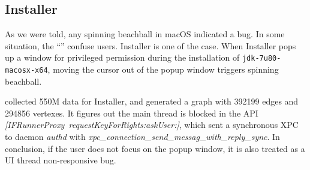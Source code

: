 \subsection{Installer}
As we were told, any spinning beachball in macOS indicated a bug. In some
situation, the ``'' confuse users. Installer is one of the case. When
Installer pops up a window for privileged permission during the installation of
\texttt{jdk-7u80-macosx-x64}, moving the cursor out of the popup window triggers
spinning beachball.

\xxx collected 550M data for Installer, and generated a graph with
392199 edges and 294856 vertexes. It figures out the main thread is
blocked in the API \textit{[IFRunnerProxy\ requestKeyForRights:askUser:]},
which sent a synchronous XPC to daemon \textit{authd} with
\textit{xpc\_connection\_send\_messag\_with\_reply\_sync}.
In conclusion, if the
user does not focus on the popup window, it is also treated as a UI thread
non-responsive bug.